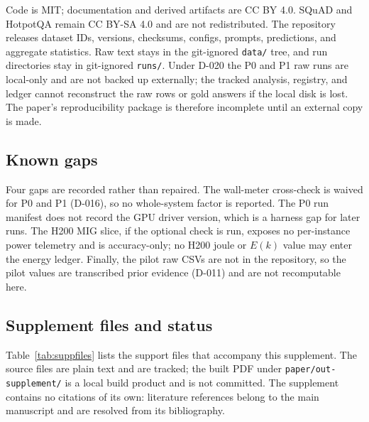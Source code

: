 Code is MIT; documentation and derived artifacts are CC BY 4.0. SQuAD and HotpotQA remain
CC BY-SA 4.0 and are not redistributed. The repository releases dataset IDs, versions,
checksums, configs, prompts, predictions, and aggregate statistics. Raw text stays in the
git-ignored \texttt{data/} tree, and run directories stay in git-ignored \texttt{runs/}. Under
D-020 the P0 and P1 raw runs are local-only and are not backed up externally; the tracked
analysis, registry, and ledger cannot reconstruct the raw rows or gold answers if the local disk
is lost. The paper's reproducibility package is therefore incomplete until an external copy is
made.

\subsection{Known gaps}

Four gaps are recorded rather than repaired. The wall-meter cross-check is waived for P0 and P1
(D-016), so no whole-system factor is reported. The P0 run manifest does not record the GPU
driver version, which is a harness gap for later runs. The H200 MIG slice, if the optional check
is run, exposes no per-instance power telemetry and is accuracy-only; no H200 joule or $E(k)$
value may enter the energy ledger. Finally, the pilot raw CSVs are not in the repository, so the
pilot values are transcribed prior evidence (D-011) and are not recomputable here.

\subsection{Supplement files and status}

Table~\ref{tab:suppfiles} lists the support files that accompany this supplement. The source
files are plain text and are tracked; the built PDF under \texttt{paper/out-supplement/} is a
local build product and is not committed. The supplement contains no citations of its own:
literature references belong to the main manuscript and are resolved from its bibliography.

